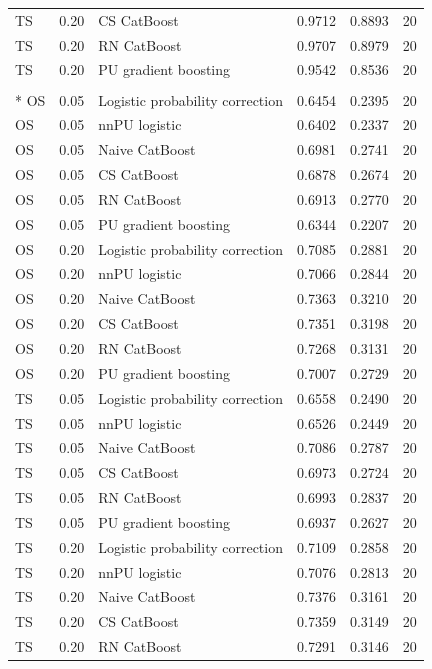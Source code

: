 \begin{longtable}{@{}p{0.65in}rp{2.85in}rrr@{}}
TS & 0.20 & CS CatBoost & 0.9712 & 0.8893 & 20 \\
TS & 0.20 & RN CatBoost & 0.9707 & 0.8979 & 20 \\
TS & 0.20 & PU gradient boosting & 0.9542 & 0.8536 & 20 \\
\addlinespace[2pt]
\multicolumn{6}{l}{\textbf{Online Shoppers}}\\*
OS & 0.05 & Logistic probability correction & 0.6454 & 0.2395 & 20 \\
OS & 0.05 & nnPU logistic & 0.6402 & 0.2337 & 20 \\
OS & 0.05 & Naive CatBoost & 0.6981 & 0.2741 & 20 \\
OS & 0.05 & CS CatBoost & 0.6878 & 0.2674 & 20 \\
OS & 0.05 & RN CatBoost & 0.6913 & 0.2770 & 20 \\
OS & 0.05 & PU gradient boosting & 0.6344 & 0.2207 & 20 \\
\addlinespace[2pt]
OS & 0.20 & Logistic probability correction & 0.7085 & 0.2881 & 20 \\
OS & 0.20 & nnPU logistic & 0.7066 & 0.2844 & 20 \\
OS & 0.20 & Naive CatBoost & 0.7363 & 0.3210 & 20 \\
OS & 0.20 & CS CatBoost & 0.7351 & 0.3198 & 20 \\
OS & 0.20 & RN CatBoost & 0.7268 & 0.3131 & 20 \\
OS & 0.20 & PU gradient boosting & 0.7007 & 0.2729 & 20 \\
\addlinespace[2pt]
TS & 0.05 & Logistic probability correction & 0.6558 & 0.2490 & 20 \\
TS & 0.05 & nnPU logistic & 0.6526 & 0.2449 & 20 \\
TS & 0.05 & Naive CatBoost & 0.7086 & 0.2787 & 20 \\
TS & 0.05 & CS CatBoost & 0.6973 & 0.2724 & 20 \\
TS & 0.05 & RN CatBoost & 0.6993 & 0.2837 & 20 \\
TS & 0.05 & PU gradient boosting & 0.6937 & 0.2627 & 20 \\
\addlinespace[2pt]
TS & 0.20 & Logistic probability correction & 0.7109 & 0.2858 & 20 \\
TS & 0.20 & nnPU logistic & 0.7076 & 0.2813 & 20 \\
TS & 0.20 & Naive CatBoost & 0.7376 & 0.3161 & 20 \\
TS & 0.20 & CS CatBoost & 0.7359 & 0.3149 & 20 \\
TS & 0.20 & RN CatBoost & 0.7291 & 0.3146 & 20 \\

\end{longtable}
